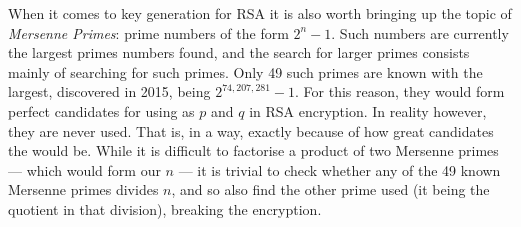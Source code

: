 \documentclass[12pt, titlepage]{article}
\begin{document}
When it comes to key generation for RSA it is also worth bringing up the topic of
\emph{Mersenne Primes}:\autocite[33]{dence} prime numbers of the form $2^n - 1$. Such
numbers are currently the largest primes numbers found, and the search for larger primes
consists mainly of searching for such primes. Only 49 such primes are known with the
largest, discovered in 2015, being $2^{74,207,281} - 1$.\autocite{newscientist_mersenne} For
this reason, they would form perfect candidates for using as $p$ and $q$ in RSA encryption.
In reality however, they are never used. That is, in a way, exactly because of how great
candidates the would be. While it is difficult to factorise a product of two Mersenne primes
--- which would form our $n$ --- it is trivial to check whether any of the 49 known Mersenne
primes divides $n$, and so also find the other prime used (it being the quotient in that
division), breaking the encryption.



\printbibliography
\end{document}
